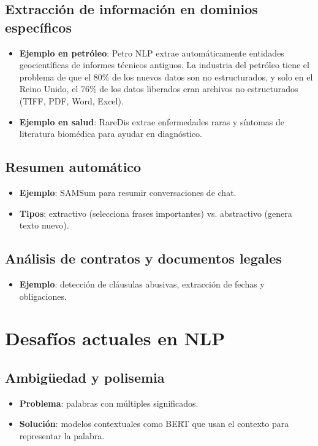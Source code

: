 \documentclass[12pt,a4paper,openany,oneside]{book}
\begin{document}
\subsection{Extracción de información en dominios específicos}
\begin{itemize}
    \item \textbf{Ejemplo en petróleo}: Petro NLP extrae automáticamente entidades geocientíficas de informes técnicos antiguos. La industria del petróleo tiene el problema de que el 80\% de los nuevos datos son no estructurados, y solo en el Reino Unido, el 76\% de los datos liberados eran archivos no estructurados (TIFF, PDF, Word, Excel).
    \item \textbf{Ejemplo en salud}: RareDis extrae enfermedades raras y síntomas de literatura biomédica para ayudar en diagnóstico.
\end{itemize}

\subsection{Resumen automático}
\begin{itemize}
    \item \textbf{Ejemplo}: SAMSum para resumir conversaciones de chat.
    \item \textbf{Tipos}: extractivo (selecciona frases importantes) vs. abstractivo (genera texto nuevo).
\end{itemize}

\subsection{Análisis de contratos y documentos legales}
\begin{itemize}
    \item \textbf{Ejemplo}: detección de cláusulas abusivas, extracción de fechas y obligaciones.
\end{itemize}

\section{Desafíos actuales en NLP}

\subsection{Ambigüedad y polisemia}
\begin{itemize}
    \item \textbf{Problema}: palabras con múltiples significados.
    \item \textbf{Solución}: modelos contextuales como BERT que usan el contexto para representar la palabra.
\end{itemize}
\end{document}
